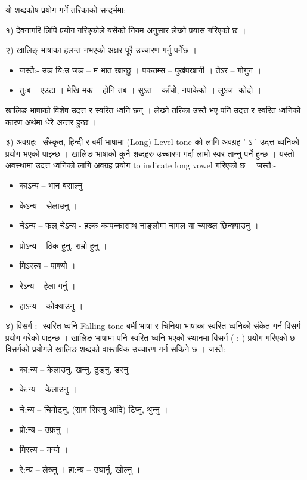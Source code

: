 \documentclass[oldfontcommands,oneside,a4paper,11pt]{article}
\newcommand{\reph}{\vphantom{अ}र्}
\begin{document}
यो शब्दकोष प्रयोग गर्ने तरिकाको सन्दर्भमा:-

१)	देवनागरि लिपि प्रयोग गरिएकोले यसैको नियम अनुसार लेख्‍ने प्रयास गरिएको छ ।

२)	खालिङ् भाषाका हलन्त नभएको अक्षर पूरै उच्‍चारण गर्नु पर्नेछ । 
\begin{itemize}
\item जस्तै:- उङ यि:उ जङ – म भात खान्छु । पकतम्स – पुर्खपखानी । तेऽर – गोगुन ।
\item  तु:ब – एउटा । मेखि मक – होनि तब । सुऽत – काँचो, नपाकेको । लुऽज- कोदो । 
\end{itemize}
खालिङ भाषाको विशेष उदत्त र स्वरित ध्वनि छन् । लेख्‍ने तरिका उस्तै भए पनि उदत्त र स्वरित ध्वनिको कारण अर्थमा धेरै अन्तर हुन्छ ।

३) अवग्रह:- सँस्कृत, हिन्दी र बर्मी भाषामा (Long) Level tone को लागि अवग्रह  ' ऽ ' उदत्त ध्वनिको प्रयोग भएको पाइन्छ । खालिङ भाषाको कुनै शब्दहरु उच्‍चारण गर्दा लामो स्वर तान्‍नु पर्ने हुन्छ । यस्तो अवस्थामा उदत्त ध्वनिको लागि अवग्रह प्रयोग to indicate long vowel गरिएको छ । जस्तै:-
\begin{itemize}
\item काऽन्य – भान बसाल्‍नु ।
\item केऽन्य – सेलाउनु ।
\item चेऽन्य – फल् चेऽन्य - हल्क कम्पन्कासाथ नाङ्लोमा चामल या च्याख्ल छिन्क्याउनु ।
\item प्रोऽन्य – ठिक हुनु, राम्रो हुनु ।
\item मिऽस्त्य – पाक्यो । 
\item रेऽन्य – हेला गर्नु ।
\item हाऽन्य – कोक्याउनु ।
\end{itemize}

४) विस\reph{}ग :-	 स्वरित ध्वनि Falling tone
बर्मी भाषा र चिनिया भाषाका स्वरित ध्वनिको संकेत गर्न विस\reph{}ग प्रयोग गरेको पाइन्छ । खालिङ भाषामा पनि स्वरित ध्वनि भएको स्थानमा विस\reph{}ग ( : ) प्रयोग गरिएको छ । विस\reph{}गको प्रयोगले खालिङ शब्दको वास्तविक उच्‍चारण गर्न सकिने छ । 
जस्तै:-
\begin{itemize}
\item  का:न्य – केलाउनु, खन्‍नु, ठुङ्‍नु, डस्‍नु ।
\item  के:न्य – केलाउनु ।
\item  चे:न्य – चिमोट्‍नु, (साग सिस्‍नु आदि) टिप्‍नु, थुन्‍नु ।
\item  प्रो:न्य – उफ्रनु । 
\item  मिस्त्य –  मर्‍यो ।
\item  रे:न्य – लेख्‍नु । 
हा:न्य – उघार्नु, खोल्‍नु ।
\end{itemize}
\end{document}
